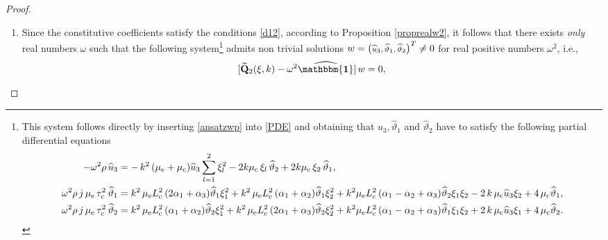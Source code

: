 \documentclass[10pt]{article}
\newcommand{\id}{{\mathbf{\mathbbm{1}}}}
\def\dd{\displaystyle}
\def\dd{\displaystyle}
\begin{document}
\begin{proof}
\begin{enumerate}
 In conclusion,  if  there exists a value of $v$ such that the equation \eqref{x9} admits a real solution $r_v$, then $v$  must satisfy 
 $
 v\geq \widehat{v}.
$
Thus,  if $v$ is such that
 $
 0\le v<\widehat{v},
 $
 then $r$ can not be real and if $r$ is real, then $v\geq\widehat{v}$.
\item 
	Since  the constitutive coefficients satisfy the conditions 	\eqref{d12}, according to Proposition \ref{proprealw2}, it follows that there exists \textit{only} real numbers $\omega$ such that the following  system\footnote{This system follows directly by inserting  \eqref{ansatzwp} into \eqref{PDE} and obtaining that   $\widehat{u}_3, \widehat{\vartheta}_1$ and $\widehat{\vartheta}_2$ have to satisfy the following partial differential equations
		\begin{align*}
		-\omega^2\rho\,\widehat{u}_3&=-\,k^2\,(\mu_{\rm e} +\mu_{\rm c})\dd \widehat{u}_3 \sum_{l=1}^2 \xi_l^2-2k\mu_{\rm c}\,\xi_l\,\widehat{\vartheta }_2 +2k\mu_{\rm c}\,\xi_2\,\widehat{\vartheta }_1 ,
		\\
		\omega^2\rho\, j\,\mu_{\rm e}\,\tau_{\rm c}^2\,\widehat{ \vartheta }_1&=k^2\,{\mu_{\rm e}L_{\rm c}^2}\,(2\alpha_1+\alpha_3)\widehat{ \vartheta }_1\xi_1^2+k^2\,{\mu_{\rm e}L_{\rm c}^2}\,(\alpha_1+\alpha_2)\widehat{ \vartheta }_1\xi_2^2+k^2{\mu_{\rm e}L_{\rm c}^2}\,(\alpha_1-\alpha_2+\alpha_3)\widehat{ \vartheta }_2\xi_1\xi_2 -2\,k\,\mu_{\rm c}\widehat{u}_3 \xi_2+4\, \mu_{\rm c} \widehat{\vartheta }_1,\vspace{1mm}\notag\\
		\omega^2\rho\, j\,\mu_{\rm e}\,\tau_{\rm c}^2\,\widehat{ \vartheta }_2&=k^2\,{\mu_{\rm e}L_{\rm c}^2}\,(\alpha_1+\alpha_2)\widehat{ \vartheta }_2\xi_1^2+k^2\,{\mu_{\rm e}L_{\rm c}^2}\,(2\alpha_1+\alpha_3)\widehat{ \vartheta }_2\xi_2^2+k^2{\mu_{\rm e}L_{\rm c}^2}\,(\alpha_1-\alpha_2+\alpha_3)\widehat{ \vartheta }_1\xi_1\xi_2 +2\,k\,\mu_{\rm c}\widehat{u}_3 \xi_1+4\, \mu_{\rm c} \widehat{\vartheta }_2.\notag\\
		\end{align*}}  admits non trivial solutions $w=\begin{footnotesize}\begin{pmatrix}
	\widehat{u}_3, \widehat{\vartheta}_1, \widehat{\vartheta}_2
	\end{pmatrix}\end{footnotesize}^T\neq 0$  for  real positive numbers $\omega^2$, i.e.,
	\begin{align}\label{vz1}
	[\widetilde{\mathbf{Q}}_2(\xi,k)-\omega^2\widehat{\id}]\, w=0,

\end{align}
\end{enumerate}
\end{proof}
\end{document}
